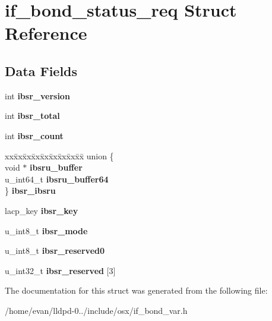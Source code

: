 \section{if\-\_\-bond\-\_\-status\-\_\-req \-Struct \-Reference}
\label{structif__bond__status__req}
\subsection*{\-Data \-Fields}
\begin{DoxyCompactItemize}
\item 
int {\bfseries ibsr\-\_\-version}\label{structif__bond__status__req_a87c8e483d2cdd7462f308af8314969fa}

\item 
int {\bfseries ibsr\-\_\-total}\label{structif__bond__status__req_a76440332dda375f150f57c8b3ae2b20b}

\item 
int {\bfseries ibsr\-\_\-count}\label{structif__bond__status__req_ab72e31cbf697d684b04ec82f573ed3c3}

\item 
\begin{tabbing}
xx\=xx\=xx\=xx\=xx\=xx\=xx\=xx\=xx\=\kill
union \{\\
\>void $\ast$ {\bfseries ibsru\_buffer}\\
\>u\_int64\_t {\bfseries ibsru\_buffer64}\\
\} {\bfseries ibsr\_ibsru}\label{structif__bond__status__req_aa892c69d2fd5463e7da454e7c5f0c288}
\\

\end{tabbing}\item 
lacp\-\_\-key {\bfseries ibsr\-\_\-key}\label{structif__bond__status__req_a5eaad3075e665813913a9c5f7ec24c27}

\item 
u\-\_\-int8\-\_\-t {\bfseries ibsr\-\_\-mode}\label{structif__bond__status__req_ade54b96c44d4d3d62dc1e0d0b1577632}

\item 
u\-\_\-int8\-\_\-t {\bfseries ibsr\-\_\-reserved0}\label{structif__bond__status__req_a4b54965a068c2d22809c0765cab95ab6}

\item 
u\-\_\-int32\-\_\-t {\bfseries ibsr\-\_\-reserved} [3]\label{structif__bond__status__req_ae6130e2168823ebaf038505454acd6d9}

\end{DoxyCompactItemize}


\-The documentation for this struct was generated from the following file\-:\begin{DoxyCompactItemize}
\item 
/home/evan/lldpd-\/0../include/osx/if\-\_\-bond\-\_\-var.\-h\end{DoxyCompactItemize}

